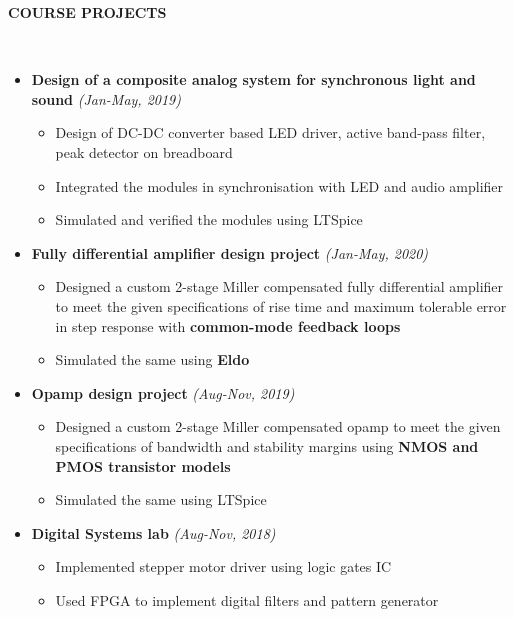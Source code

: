 \documentclass[a4paper,8pt]{article}
\newcommand{\isep}{-2 pt}
\newcommand{\lsep}{-0.5cm}
\newcommand{\resheading}[1]{{\small \colorbox{mygrey}{\begin{minipage}{0.975\textwidth}{\textbf{#1 \vphantom{p\^{E}}}}\end{minipage}}}}
\begin{document}
\resheading{\textbf{COURSE PROJECTS} }\\[\lsep]
\vspace{2mm}
\begin{itemize}
 \item \textbf{Design of a composite analog system for synchronous light and sound} \hfill \emph{(Jan-May, 2019)} \\[-0.6cm]
	\begin{itemize}\itemsep \isep
	\item  Design of DC-DC converter based LED driver, active band-pass filter, peak detector on breadboard
	\item Integrated the modules in synchronisation with LED and audio amplifier
	\item Simulated and verified the modules using LTSpice 
	\end{itemize}

\item \textbf{Fully differential amplifier design project}  \hfill \emph{(Jan-May, 2020)} \\[-0.6cm] 
	\begin{itemize}\itemsep \isep
	\item  Designed a custom 2-stage Miller compensated fully differential amplifier to meet the given specifications of rise time and maximum tolerable error in step response with \textbf{common-mode feedback loops}
	\item Simulated the same using \textbf{Eldo}
	\end{itemize}	

  \item \textbf{Opamp design project}  \hfill \emph{(Aug-Nov, 2019)} \\[-0.6cm] 
	\begin{itemize}\itemsep \isep
	\item  Designed a custom 2-stage Miller compensated opamp to meet the given specifications of bandwidth and stability margins using \textbf{NMOS and PMOS transistor models}
	\item Simulated the same using LTSpice
	\end{itemize}
	
	
  \item \textbf{Digital Systems lab	} \hfill \emph{(Aug-Nov, 2018)} \\[-0.6cm] 
	\begin{itemize}\itemsep \isep
	\item Implemented stepper motor driver using logic gates IC
	\item Used FPGA to implement digital filters and pattern generator 
	\end{itemize}
\end{itemize}
\end{document}
